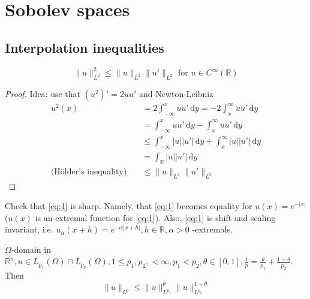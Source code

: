 \documentclass{report}
\begin{document}
\tableofcontents

\setcounter{chapter}{1}

\chapter{Sobolev spaces}
\section{Interpolation inequalities}

\ex{}
{
    \begin{equation} \label{eq:1}
        \|u\|_{L^{2}}^{2} \leq \|u\|_{L^{2}} \|u'\|_{L^{2}} \text{ for } u \in C^{\infty}(\mathbb{R}) 
    \end{equation}
}

\begin{proof}
    Idea: use that \((u^2)' = 2uu'\) and Newton-Leibniz
    \begin{align*}
        u^2(x) &= 2 \int_{-\infty}^{x} u u' \,\mathrm{d}y = -2 \int_{x}^{\infty} u u' \,\mathrm{d}y \\
        &= \int_{-\infty}^{x} u u' \,\mathrm{d}y - \int_{x}^{\infty} u u' \,\mathrm{d}y \\
        & \leq \int_{-\infty}^{x} \vert u \vert \vert u' \vert \,\mathrm{d}y + \int_{x}^{\infty} \vert u \vert \vert u' \vert \,\mathrm{d}y \\
        &= \int_{\mathbb{R}} \vert u \vert \vert u' \vert \,\mathrm{d}y \\
        \text{(Hölder's inequality)} \quad & \leq \|u\|_{L^{2}} \|u'\|_{L^{2}}
    \end{align*}
\end{proof}

\qs{}
{
    Check that \ref{eq:1} is sharp. Namely, that \ref{eq:1} becomes equality for \(u(x) = e^{-\vert x \vert}\) (\(u(x)\) is an extremal function for \ref{eq:1}). Also, \ref{eq:1} is shift and scaling invariant, i.e. \(u_{\alpha}(x+h) = e^{-\alpha|x+h|}, h \in \mathbb{R}, \alpha>0\) -extremals.
}

{
    \(\Omega\)-domain in \(\mathbb{R}^{n}, u \in L_{p_1}(\Omega) \cap L_{p_2}(\Omega), 1 \leq p_1, p_2, < \infty, p_1 < p_2, \theta \in [0, 1], \frac{1}{p} = \frac{\theta}{p_1} + \frac{1-\theta}{p_2}\). Then
    \begin{equation}\label{eq:2}
        \|u\|_{L^{p}} \leq \|u\|_{L^{p_1}}^{\theta} \|u\|_{L^{p_2}}^{1 - \theta}
    \end{equation} 
}
\end{document}
